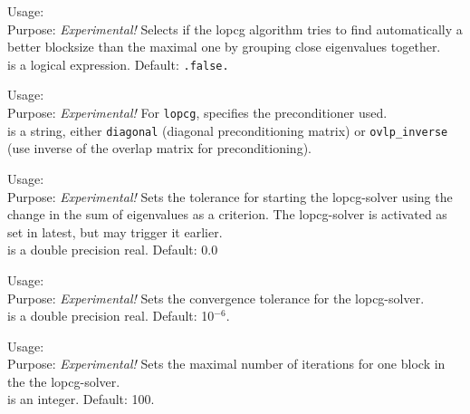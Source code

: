 {
  \noindent
  Usage:   \\[1.0ex]
  Purpose: \emph{Experimental!} Selects if the lopcg algorithm tries to find
    automatically a better blocksize than the maximal one by grouping close
    eigenvalues together. \\[1.0ex]
   is a logical expression. Default: \texttt{.false.} \\
}

{
  \noindent
  Usage:   \\[1.0ex]
  Purpose: \emph{Experimental!} For  \texttt{lopcg},
    specifies the preconditioner used. \\[1.0ex]
   is a string, either \texttt{diagonal} (diagonal preconditioning
    matrix) or \texttt{ovlp\_inverse} (use inverse of the overlap matrix for
    preconditioning). \\
}

{
  \noindent
  Usage:   \\[1.0ex]
  Purpose: \emph{Experimental!} Sets the tolerance for starting the lopcg-solver
    using the change in the sum of eigenvalues as a criterion. The lopcg-solver
    is activated as set in  latest, but
     may trigger it earlier. \\[1.0ex]
   is a double precision real. Default: 0.0 \\
}

{
  \noindent
  Usage:   \\[1.0ex]
  Purpose: \emph{Experimental!} Sets the convergence tolerance for the
    lopcg-solver.\\[1.0ex]
   is a double precision real. Default: 10$^{-6}$. \\
}

{
  \noindent
  Usage:   \\[1.0ex]
  Purpose: \emph{Experimental!} Sets the maximal number of iterations for one
    block in the the lopcg-solver.\\[1.0ex]
   is an integer. Default: 100. \\
}

